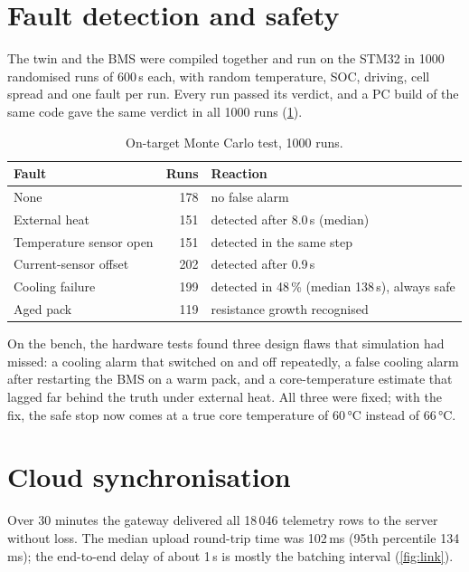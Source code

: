 \section{Fault detection and safety}
The twin and the BMS were compiled together and run on the STM32 in 1000 randomised runs of 600\,s each, with random temperature, SOC, driving, cell spread and one fault per run. Every run passed its verdict, and a PC build of the same code gave the same verdict in all 1000 runs (\cref{tab:mc}).

\begin{table}[htbp]\centering\small
\caption{On-target Monte Carlo test, 1000 runs.}\label{tab:mc}
\begin{tabular}{@{}lrl@{}}\toprule
Fault & Runs & Reaction \\\midrule
None & 178 & no false alarm \\
External heat & 151 & detected after 8.0\,s (median) \\
Temperature sensor open & 151 & detected in the same step \\
Current-sensor offset & 202 & detected after 0.9\,s \\
Cooling failure & 199 & detected in 48\,\% (median 138\,s), always safe \\
Aged pack & 119 & resistance growth recognised \\\bottomrule
\end{tabular}
\end{table}


On the bench, the hardware tests found three design flaws that simulation had missed: a cooling alarm that switched on and off repeatedly, a false cooling alarm after restarting the BMS on a warm pack, and a core-temperature estimate that lagged far behind the truth under external heat. All three were fixed; with the fix, the safe stop now comes at a true core temperature of 60\,°C instead of 66\,°C.

\section{Cloud synchronisation}
Over 30 minutes the gateway delivered all 18\,046 telemetry rows to the server without loss. The median upload round-trip time was 102\,ms (95th percentile 134\,ms); the end-to-end delay of about 1\,s is mostly the batching interval (\cref{fig:link}).


